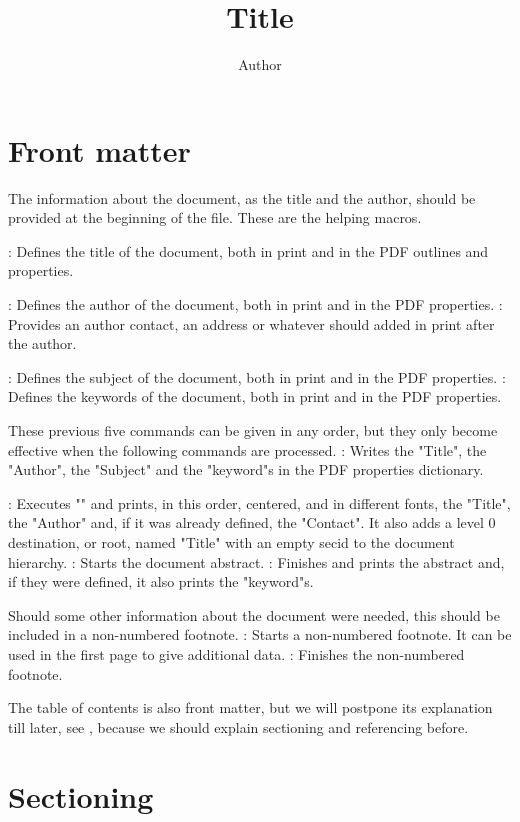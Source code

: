 \section{Front matter}

The information about the document, as the title and the author,
should be provided at the beginning of the file.
These are the helping macros.
\command\title{Title}: Defines the title
 of the document, both in print and in the PDF outlines and properties.
\command\author{Author}: Defines the author
 of the document, both in print and in the PDF properties.
\command{}: Provides an author contact, an address
 or whatever should added in print after the author.
\command\subject{Subject}: Defines the subject
 of the document, both in print and in the PDF properties.
\command{}: Defines the keywords
 of the document, both in print and in the PDF properties.

These previous five commands can be given in any order,
but they only become effective when the following commands
are processed.
\command\infodoc: Writes the "Title", the "Author",
the "Subject" and the "keyword"s in the PDF properties dictionary.
\command\maketitle: Executes "\infodoc" and prints,
in this order, centered, and in different fonts,
the "Title", the "Author"
and, if it was already defined, the "Contact".
It also adds a level 0 destination, or root,
named "Title" with an empty {\sc secid} to the document
hierarchy.
\command\beginabstract: Starts the document abstract.
\command\endabstract: Finishes and prints the abstract and,
 if they were defined, it also prints the "keyword"s.

Should some other information about the document were needed,
this should be included in a non-numbered footnote.
\command\beginnote: Starts a non-numbered footnote.
 It can be used in the first page to give additional data.
\command\endnote: Finishes the non-numbered footnote.

The table of contents is also front matter,
but we will postpone its explanation till later,
see ,
because we should explain sectioning and referencing before.


\section{Sectioning}

